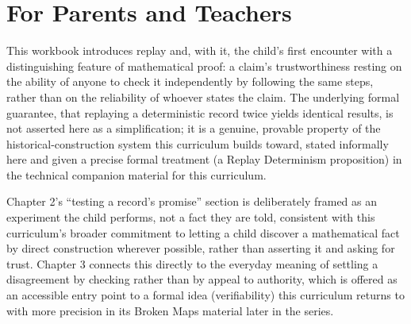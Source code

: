 \documentclass[11pt]{book}
\begin{document}
\chapter*{For Parents and Teachers}

This workbook introduces replay and, with it, the child's first encounter with a distinguishing feature of mathematical proof: a claim's trustworthiness resting on the ability of anyone to check it independently by following the same steps, rather than on the reliability of whoever states the claim. The underlying formal guarantee, that replaying a deterministic record twice yields identical results, is not asserted here as a simplification; it is a genuine, provable property of the historical-construction system this curriculum builds toward, stated informally here and given a precise formal treatment (a Replay Determinism proposition) in the technical companion material for this curriculum.

Chapter 2's ``testing a record's promise'' section is deliberately framed as an experiment the child performs, not a fact they are told, consistent with this curriculum's broader commitment to letting a child discover a mathematical fact by direct construction wherever possible, rather than asserting it and asking for trust. Chapter 3 connects this directly to the everyday meaning of settling a disagreement by checking rather than by appeal to authority, which is offered as an accessible entry point to a formal idea (verifiability) this curriculum returns to with more precision in its Broken Maps material later in the series.
\end{document}
